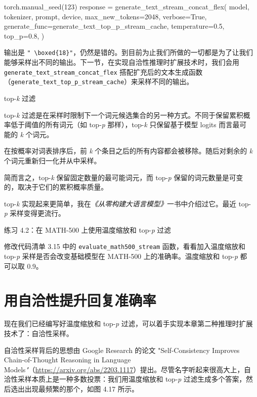 \begin{codebox}
torch.manual_seed(123)
response = generate_text_stream_concat_flex(
    model, tokenizer, prompt, device,
    max_new_tokens=2048, verbose=True,
    generate_func=generate_text_top_p_stream_cache,
    temperature=0.5,
    top_p=0.8,
)
\end{codebox}

输出是 \texttt{"}\texttt{ \textbackslash boxed\{18\}}\texttt{"}，仍然是错的。到目前为止我们所做的一切都是为了让我们能够采样出不同的输出。下一节，在实现自洽性推理时扩展技术时，我们会用 \texttt{generate\_text\_stream\_concat\_flex} 搭配扩充后的文本生成函数（\texttt{generate\_text\_top\_p\_stream\_cache}）来采样不同的输出。

\begin{mySidebar}{top-\emph{k} 过滤}

top-\emph{k} 过滤是在采样时限制下一个词元候选集合的另一种方式。不同于保留累积概率低于阈值的所有词元（如 top-\emph{p} 那样），top-\emph{k} 只保留基于模型 logits 而言最可能的 \emph{k} 个词元。

在按概率对词表排序后，前 \emph{k} 个条目之后的所有内容都会被移除。随后对剩余的 \emph{k} 个词元重新归一化并从中采样。

简而言之，top-\emph{k} 保留固定数量的最可能词元，而 top-\emph{p} 保留的词元数量是可变的，取决于它们的累积概率质量。

top-\emph{k} 实现起来更简单，我在\emph{《从零构建大语言模型》}一书中介绍过它。最近 top-\emph{p} 采样变得更流行。

\end{mySidebar}

\begin{mySidebar}{练习 4.2：在 MATH-500 上使用温度缩放和 top-\emph{p} 过滤}

修改代码清单 3.15 中的 \texttt{evaluate\_math500\_stream} 函数，看看加入温度缩放和 top-\emph{p }采样是否会改变基础模型在 MATH-500 上的准确率。温度缩放和 top-\emph{p} 都可以取 0.9。

\end{mySidebar}

\section{用自洽性提升回复准确率}

现在我们已经编写好温度缩放和 top-\emph{p} 过滤，可以着手实现本章第二种推理时扩展技术了：自洽性采样。

自洽性采样背后的思想由 Google Research 的论文 "Self-Consistency Improves Chain-of-Thought Reasoning in Language Models\emph{"}（\href{https://arxiv.org/abs/2203.1117}{https://arxiv.org/abs/2203.1117}）提出。尽管名字听起来很高大上，自洽性采样本质上是一种多数投票：我们用温度缩放和 top-\emph{p} 过滤生成多个答案，然后选出出现最频繁的那个，如图 4.17 所示。

